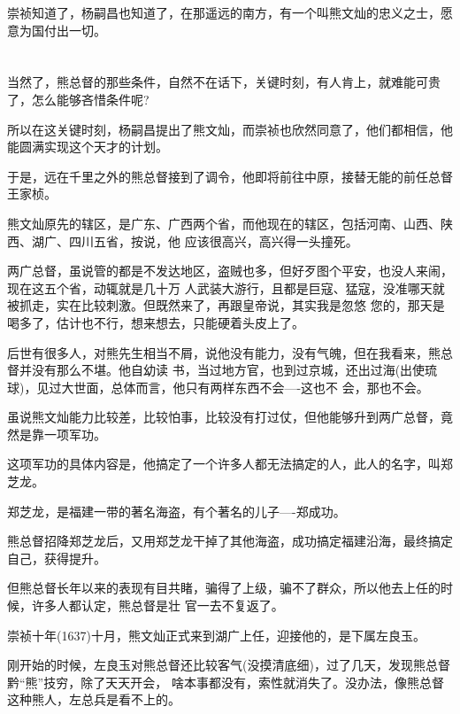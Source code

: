 \documentclass[11pt,a4paper,onecolumn]{article}
\begin{document}
崇祯知道了，杨嗣昌也知道了，在那遥远的南方，有一个叫熊文灿的忠义之士，愿意为国付出一切。

\section[\thesection]{}

当然了，熊总督的那些条件，自然不在话下，关键时刻，有人肯上，就难能可贵了，怎么能够吝惜条件呢?

所以在这关键时刻，杨嗣昌提出了熊文灿，而崇祯也欣然同意了，他们都相信，他能圆满实现这个天才的计划。

于是，远在千里之外的熊总督接到了调令，他即将前往中原，接替无能的前任总督王家桢。

熊文灿原先的辖区，是广东、广西两个省，而他现在的辖区，包括河南、山西、陕西、湖广、四川五省，按说，他
应该很高兴，高兴得一头撞死。

两广总督，虽说管的都是不发达地区，盗贼也多，但好歹图个平安，也没人来闹，现在这五个省，动辄就是几十万
人武装大游行，且都是巨寇、猛寇，没准哪天就被抓走，实在比较刺激。但既然来了，再跟皇帝说，其实我是忽悠
您的，那天是喝多了，估计也不行，想来想去，只能硬着头皮上了。

后世有很多人，对熊先生相当不屑，说他没有能力，没有气魄，但在我看来，熊总督并没有那么不堪。他自幼读
书，当过地方官，也到过京城，还出过海(出使琉球)，见过大世面，总体而言，他只有两样东西不会----这也不
会，那也不会。

虽说熊文灿能力比较差，比较怕事，比较没有打过仗，但他能够升到两广总督，竟然是靠一项军功。

这项军功的具体内容是，他搞定了一个许多人都无法搞定的人，此人的名字，叫郑芝龙。

郑芝龙，是福建一带的著名海盗，有个著名的儿子----郑成功。

熊总督招降郑芝龙后，又用郑芝龙干掉了其他海盗，成功搞定福建沿海，最终搞定自己，获得提升。

但熊总督长年以来的表现有目共睹，骗得了上级，骗不了群众，所以他去上任的时候，许多人都认定，熊总督是壮
官一去不复返了。

崇祯十年(1637)十月，熊文灿正式来到湖广上任，迎接他的，是下属左良玉。

刚开始的时候，左良玉对熊总督还比较客气(没摸清底细)，过了几天，发现熊总督黔``熊''技穷，除了天天开会，
啥本事都没有，索性就消失了。没办法，像熊总督这种熊人，左总兵是看不上的。

\section[\thesection]{}
\end{document}
